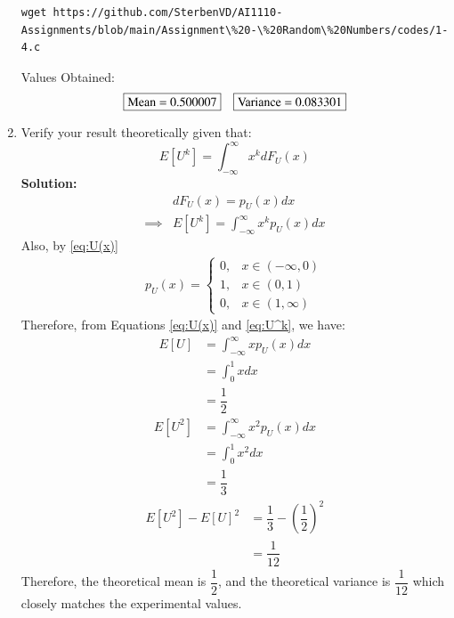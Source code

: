 \documentclass[journal,12pt,twocolumn]{IEEEtran}
\numberwithin{equation}{section}
\renewcommand\thesection{\arabic{section}}
\providecommand{\sbrak}[1]{\ensuremath{{}\left[#1\right]}}
\providecommand{\brak}[1]{\ensuremath{\left(#1\right)}}
\newcommand{\solution}{\noindent \textbf{Solution: }}
\begin{document}
\begin{enumerate}[label=\thesection.\arabic*,ref=\thesection.\theenumi]
          \begin{lstlisting}
wget https://github.com/SterbenVD/AI1110-Assignments/blob/main/Assignment\%20-\%20Random\%20Numbers/codes/1-4.c
            \end{lstlisting}
          Values Obtained:
          \begin{align}
               & \fbox{Mean =  0.500007}
               & \fbox{Variance = 0.083301}
          \end{align}
    \item Verify your result theoretically given that:
          \begin{equation}
              E\sbrak{U^k} = \int_{-\infty}^{\infty}x^kdF_{U}(x)
          \end{equation}
          \solution
          \begin{align}
                       & dF_U(x) = p_U(x) dx
              \\
              \label{eq:U^k}
              \implies & E[U^k] = \int_{-\infty}^{\infty}x^k p_U(x) dx
          \end{align}
          Also, by \eqref{eq:U(x)}
          \begin{align}
              p_U(x) =
              \begin{cases}
                  0, & x \in (-\infty,0)
                  \\
                  1, & x \in (0,1)
                  \\
                  0, & x \in (1, \infty)
              \end{cases}
          \end{align}
          Therefore, from Equations \ref{eq:U(x)} and \ref{eq:U^k}, we have:
          \begin{align}
              E[U] & =  \int_{-\infty}^{\infty}x p_U(x) dx
              \\
                   & = \int_0 ^1 x dx
              \\
                   & = \dfrac{1}{2}
          \end{align}
          \begin{align}
              E[U^2] & =  \int_{-\infty}^{\infty}x^2 p_U(x) dx
              \\
                     & = \int_0 ^1 x^2 dx
              \\
                     & = \dfrac{1}{3}
          \end{align}
          \begin{align}
              E[U^2] - E[U]^2 & = \dfrac{1}{3} - \brak{\dfrac{1}{2}}^2
              \\
                              & = \dfrac{1}{12}
          \end{align}
          Therefore, the theoretical mean is $\dfrac{1}{2}$, and the theoretical variance is $\dfrac{1}{12}$ which closely matches the experimental values.
\end{enumerate}
\end{document}
